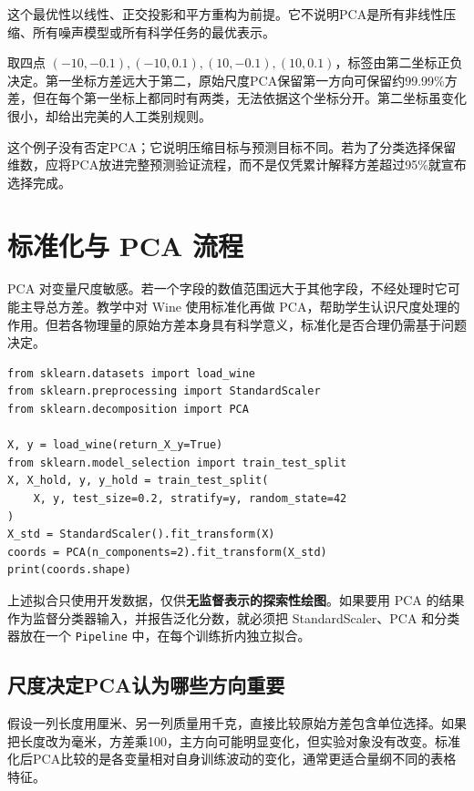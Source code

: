 这个最优性以线性、正交投影和平方重构为前提。它不说明PCA是所有非线性压缩、所有噪声模型或所有科学任务的最优表示。

取四点 $(-10,-0.1),(-10,0.1),(10,-0.1),(10,0.1)$，标签由第二坐标正负决定。第一坐标方差远大于第二，原始尺度PCA保留第一方向可保留约99.99\%方差，但在每个第一坐标上都同时有两类，无法依据这个坐标分开。第二坐标虽变化很小，却给出完美的人工类别规则。

这个例子没有否定PCA；它说明压缩目标与预测目标不同。若为了分类选择保留维数，应将PCA放进完整预测验证流程，而不是仅凭累计解释方差超过95\%就宣布选择完成。

\section{标准化与 PCA 流程}
PCA 对变量尺度敏感。若一个字段的数值范围远大于其他字段，不经处理时它可能主导总方差。教学中对 Wine 使用标准化再做 PCA，帮助学生认识尺度处理的作用。但若各物理量的原始方差本身具有科学意义，标准化是否合理仍需基于问题决定。

\begin{lstlisting}[caption={Wine 的 PCA 可视化准备}]
from sklearn.datasets import load_wine
from sklearn.preprocessing import StandardScaler
from sklearn.decomposition import PCA

X, y = load_wine(return_X_y=True)
from sklearn.model_selection import train_test_split
X, X_hold, y, y_hold = train_test_split(
    X, y, test_size=0.2, stratify=y, random_state=42
)
X_std = StandardScaler().fit_transform(X)
coords = PCA(n_components=2).fit_transform(X_std)
print(coords.shape)
\end{lstlisting}

上述拟合只使用开发数据，仅供\textbf{无监督表示的探索性绘图}。如果要用 PCA 的结果作为监督分类器输入，并报告泛化分数，就必须把 StandardScaler、PCA 和分类器放在一个 \texttt{Pipeline} 中，在每个训练折内独立拟合。


\subsection{尺度决定PCA认为哪些方向重要}
假设一列长度用厘米、另一列质量用千克，直接比较原始方差包含单位选择。如果把长度改为毫米，方差乘100，主方向可能明显变化，但实验对象没有改变。标准化后PCA比较的是各变量相对自身训练波动的变化，通常更适合量纲不同的表格特征。

